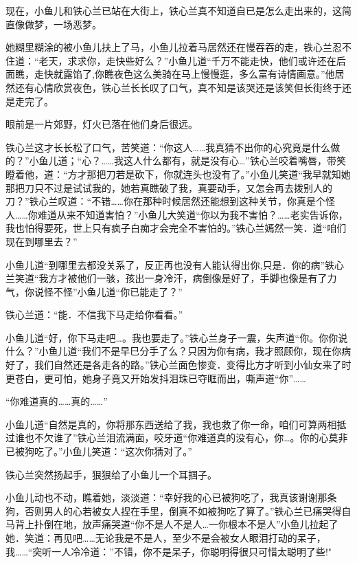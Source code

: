 \documentclass[12pt,oneside]{book}
\begin{document}
现在，小鱼儿和铁心兰已站在大街上，铁心兰真不知道自已是怎么走出来的，这简直像做梦，一场恶梦。

她糊里糊涂的被小鱼儿扶上了马，小鱼儿拉着马居然还在慢吞吞的走，铁心兰忍不住道：``老天，求求你，走快些好么？''小鱼儿道``千万不能走快，他们或许还在后面瞧，走快就露馅了,你瞧夜色这么美骑在马上慢慢逛，多么富有诗情画意。''他居然还有心情欣赏夜色，铁心兰长长叹了口气，真不知是该哭还是该笑但长街终于还是走完了。

眼前是一片郊野，灯火已落在他们身后很远。

铁心兰这才长长松了口气，苦笑道：``你这人\ldots\ldots 我真猜不出你的心究竟是什么做的？''小鱼儿道；``心？\ldots\ldots 我这人什么都有，就是没有心\ldots{}''铁心兰咬着嘴唇，带笑瞪着他，道：``方才那把刀若是砍下，你就连头也没有了。''小鱼儿笑道``我早就知她那把刀只不过是试试我的，她若真瞧破了我，真要动手，又怎会再去拨别人的刀？''铁心兰叹道：``不错\ldots\ldots 你在那种时候居然还能想到这种关节，你真是个怪人\ldots\ldots 你难道从来不知道害怕？''小鱼儿大笑道``你以为我不害怕？\ldots\ldots 老实告诉你，我也怕得要死，世上只有疯子白痴才会完全不害怕的。''铁心兰嫣然一笑．道``咱们现在到哪里去？''

小鱼儿道``到哪里去都没关系了，反正再也没有人能认得出你,只是．你的病''铁心兰笑道``我方才被他们一骇，孩出一身冷汗，病倒像是好了，手脚也像是有了力气，你说怪不怪''小鱼儿道``你已能走了？''

铁心兰道：``能．不信我下马走给你看看。''

小鱼儿道``好，你下马走吧\ldots。我也要走了。''铁心兰身子一震，失声道``你。你你说什么？''小鱼儿道``我们不是早巳分手了么？只因为你有病，我才照顾你，现在你病好了，我们自然还是各走各的路。''铁心兰面色惨变．变得比方才听到小仙女来了时更苍白，更可怕，她身子竟又开始发抖泪珠已夺眶而出，嘶声道``你''\ldots\ldots{}

``你难道真的\ldots\ldots 真的\ldots\ldots{}''

小鱼儿道``自然是真的，你将那东西送给了我，我也救了你一命，咱们可算两相抵过谁也不欠谁了''铁心兰泪流满面，咬牙道``你难道真的没有心，你\ldots。你的心莫非已被狗吃了。''小鱼儿笑道：``这次你猜对了。''

铁心兰突然扬起手，狠狠给了小鱼儿一个耳掴子。

小鱼儿动也不动，瞧着她，淡淡道：``幸好我的心已被狗吃了，我真该谢谢那条狗，否则男人的心若被女人捏在手里，倒真不如被狗吃了算了。''铁心兰已痛哭得自马背上扑倒在地，放声痛哭道``你不是人不是人\ldots 一你根本不是人''小鱼儿拉起了她．笑道：再见吧\ldots\ldots 无论我是不是人，至少不是会被女人眼泪打动的呆子，我\ldots\ldots{}``突听一人冷冷道：''不错，你不是呆子，你聪明得很只可惜太聪明了些!"
\end{document}
